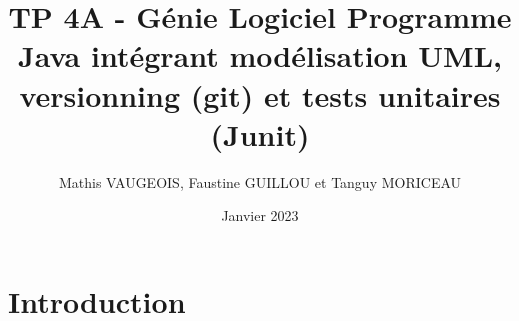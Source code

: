 \documentclass{article}
\title{TP 4A - Génie Logiciel
Programme Java intégrant modélisation UML, versionning (git)
et tests unitaires (Junit)
}
\author{Mathis VAUGEOIS, Faustine GUILLOU et Tanguy MORICEAU}
\date{Janvier 2023}
\begin{document}
\maketitle

\section{Introduction}
\end{document}
